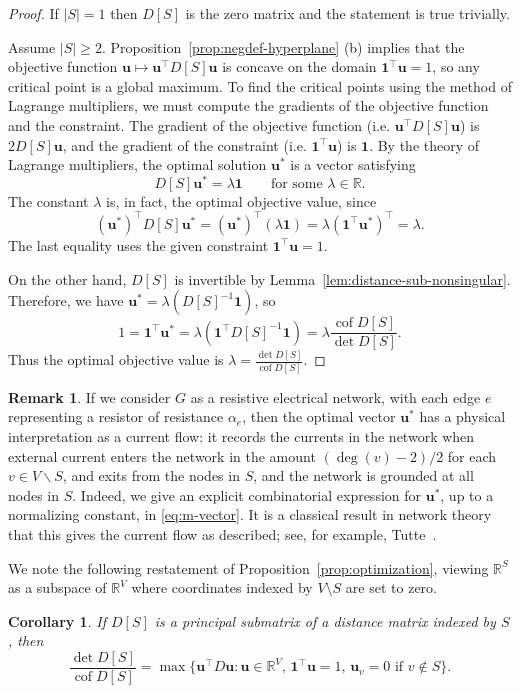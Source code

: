 \documentclass[12pt]{amsart}
\newtheorem{cor}[thm]{Corollary}
\theoremstyle{definition}
\newtheorem{rmk}[thm]{Remark}
\newcommand{\RR}{\mathbb{R}}
\newcommand{\bone}{\mathbf{1}}
\newcommand{\boldu}{\mathbf{u}}
\newcommand{\tr}{\intercal}
\DeclareMathOperator{\cof}{cof}
\begin{document}
\begin{proof}
If $|S| = 1$ then $D[S]$ is the zero matrix and the statement is true trivially.

Assume $|S| \geq 2$.
Proposition~\ref{prop:negdef-hyperplane} (b) implies that 
the objective function $\boldu \mapsto \boldu^\tr D[S]\boldu$ is concave on the domain $\bone^\tr \boldu = 1$, so any critical point is a global maximum.
To find the critical points using the method of Lagrange multipliers, we must compute the gradients of the objective function and the constraint.
The gradient of the objective function (i.e. $\boldu^\tr D[S] \boldu$) is $2 D[S] \boldu$, 
and the gradient of the constraint (i.e. $\bone^\tr \boldu$) is $\bone$.
By the theory of Lagrange multipliers, the optimal solution $\boldu^*$ is a vector satisfying
\[
	D[S] \boldu^* = \lambda \bone \qquad\text{for some }\lambda \in \RR.
\]
The constant $\lambda$ is, in fact, the optimal objective value, since
\[
	(\boldu^*)^\tr D[S] \boldu^* = (\boldu^*)^\tr (\lambda \bone) = \lambda (\bone^\tr \boldu^*)^\tr = \lambda.
\]
The last equality uses the given constraint $\bone^\tr \boldu = 1$.

On the other hand,
 $D[S]$ is invertible by Lemma~\ref{lem:distance-sub-nonsingular}. Therefore, we have $ \boldu^* = \lambda (D[S]^{-1} \bone) $, so
\[
	1 = \bone^\tr \boldu^* = \lambda (\bone^\tr D[S]^{-1} \bone)
	= \lambda \frac{\cof D[S]}{\det D[S]}.
\]
Thus the optimal objective value is
$\displaystyle
	\lambda = \frac{\det D[S]}{\cof D[S]} .
$
\end{proof}

\begin{rmk}
If we consider $G$ as a resistive electrical network, with each edge $e$ representing a resistor of resistance $\alpha_e$,
then the optimal vector $\boldu^*$
has a physical interpretation as a current flow: 
it records the currents in the network when external current enters the network in the amount $(\deg(v) - 2)/2$ for each $v \in V \backslash S$,
and exits from the nodes in $S$, and the network is grounded at all nodes in $S$.
Indeed, we give an explicit combinatorial expression for $\boldu^*$, up to a normalizing constant, in \eqref{eq:m-vector}. It is a classical result in network theory that this gives the current flow as described; see, for example, Tutte~\cite[Section VI.6]{tutte}.
\end{rmk}

We note the following restatement of Proposition~\ref{prop:optimization}, viewing $\RR^S$ as a subspace of $\RR^V$ 
where coordinates indexed by $V \setminus S$ are set to zero.
\begin{cor}
\label{cor:optimization}
If $D[S]$ is a principal submatrix of a distance matrix indexed by $S$, then 
\[
	\frac{\det D[S]}{\cof D[S]} = \max \{\boldu^\tr D \boldu \colon \boldu \in \RR^V,\, \bone^\tr \boldu = 1,\, \boldu_v = 0 \text{ if } v \not\in S \}.
\]
\end{cor}
\end{document}
